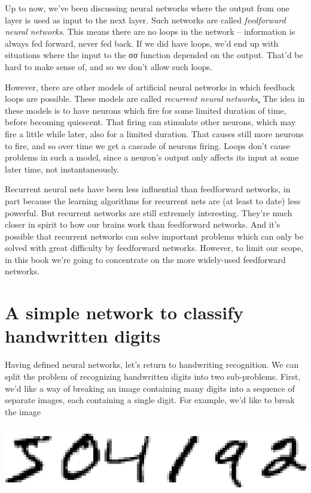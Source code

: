 \documentclass[a4paper,12pt]{report}%
\begin{document}
Up to now, we've been discussing neural networks where the output from one layer is used as input to the next layer. Such networks are called {\it feedforward neural networks}. This means there are no loops in the network -- information is always fed forward, never fed back. If we did have loops, we'd end up with situations where the input to the σσ function depended on the output. That'd be hard to make sense of, and so we don't allow such loops.

However, there are other models of artificial neural networks in which feedback loops are possible. These models are called {\it recurrent neural networks}\href{https://en.wikipedia.org/wiki/Recurrent_neural_network}. The idea in these models is to have neurons which fire for some limited duration of time, before becoming quiescent. That firing can stimulate other neurons, which may fire a little while later, also for a limited duration. That causes still more neurons to fire, and so over time we get a cascade of neurons firing. Loops don't cause problems in such a model, since a neuron's output only affects its input at some later time, not instantaneously.

Recurrent neural nets have been less influential than feedforward networks, in part because the learning algorithms for recurrent nets are (at least to date) less powerful. But recurrent networks are still extremely interesting. They're much closer in spirit to how our brains work than feedforward networks. And it's possible that recurrent networks can solve important problems which can only be solved with great difficulty by feedforward networks. However, to limit our scope, in this book we're going to concentrate on the more widely-used feedforward networks.

\section{A simple network to classify handwritten digits}
Having defined neural networks, let's return to handwriting recognition. We can split the problem of recognizing handwritten digits into two sub-problems. First, we'd like a way of breaking an image containing many digits into a sequence of separate images, each containing a single digit. For example, we'd like to break the image
\begin{center}
 \includegraphics[width=0.4\linewidth]{images/digits.png}
\end{center}
\end{document}
